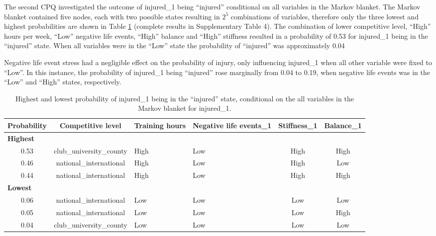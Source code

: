 \documentclass[
  english,
  man]{apa6}
\begin{document}
The second CPQ investigated the outcome of injured\_1 being ``injured'' conditional on all variables in the Markov blanket.
The Markov blanket contained five nodes, each with two possible states resulting in \(2^5\) combinations of variables, therefore only the three lowest and highest probabilities are shown in Table \ref{tab:table5} (complete results in Supplementary Table 4).
The combination of lower competitive level, ``High'' hours per week, ``Low'' negative life events, ``High'' balance and ``High'' stiffness resulted in a probability of 0.53 for injured\_1 being in the ``injured'' state.
When all variables were in the ``Low'' state the probability of ``injured'' was approximately 0.04

Negative life event stress had a negligible effect on the probability of injury, only influencing injured\_1 when all other variable were fixed to ``Low''.
In this instance, the probability of injured\_1 being ``injured'' rose marginally from 0.04 to 0.19, when negative life events was in the ``Low'' and ``High'' states, respectively.

\begin{table}[H]

\caption{\label{tab:table5}Highest and lowest probability of injured\_1 being in the ``injured'' state, conditional on the all variables in the Markov blanket for injured\_1.}
\centering
\fontsize{11}{13}\selectfont
\begin{tabular}[t]{c|c|>{\centering\arraybackslash}p{2cm}|>{\centering\arraybackslash}p{2cm}|c|c}
\hline
\textbf{Probability} & \textbf{Competitive level} & \textbf{Training hours} & \textbf{Negative life events\_1} & \textbf{Stiffness\_1} & \textbf{Balance\_1}\\
\hline
\multicolumn{6}{l}{\textbf{Highest}}\\
\hline
\hspace{1em}0.53 & club\_university\_county & High & Low & High & High\\
\hline
\hspace{1em}0.46 & national\_international & High & Low & High & Low\\
\hline
\hspace{1em}0.44 & national\_international & High & Low & High & High\\
\hline
\multicolumn{6}{l}{\textbf{Lowest}}\\
\hline
\hspace{1em}0.06 & national\_international & Low & Low & Low & Low\\
\hline
\hspace{1em}0.05 & national\_international & Low & Low & Low & High\\
\hline
\hspace{1em}0.04 & club\_university\_county & Low & Low & Low & Low\\
\hline
\end{tabular}
\end{table}
\end{document}
